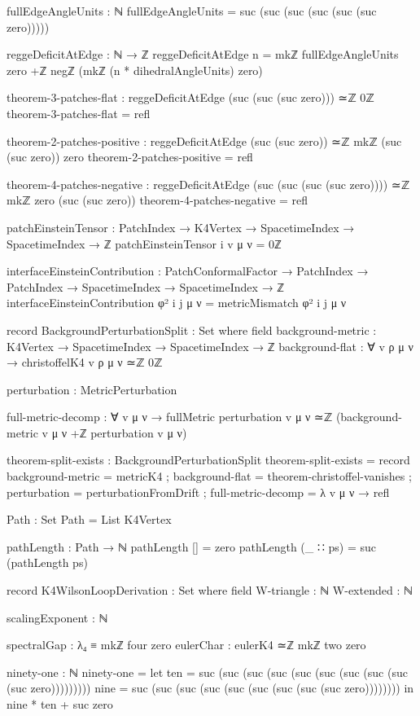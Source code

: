\documentclass[11pt,a4paper]{book}
\begin{document}
\begin{code}
fullEdgeAngleUnits : ℕ
fullEdgeAngleUnits = suc (suc (suc (suc (suc (suc zero)))))


reggeDeficitAtEdge : ℕ → ℤ
reggeDeficitAtEdge n = 
  mkℤ fullEdgeAngleUnits zero +ℤ 
  negℤ (mkℤ (n * dihedralAngleUnits) zero)

theorem-3-patches-flat : reggeDeficitAtEdge (suc (suc (suc zero))) ≃ℤ 0ℤ
theorem-3-patches-flat = refl

theorem-2-patches-positive : reggeDeficitAtEdge (suc (suc zero)) ≃ℤ mkℤ (suc (suc zero)) zero
theorem-2-patches-positive = refl

theorem-4-patches-negative : reggeDeficitAtEdge (suc (suc (suc (suc zero)))) ≃ℤ mkℤ zero (suc (suc zero))
theorem-4-patches-negative = refl

patchEinsteinTensor : PatchIndex → K4Vertex → SpacetimeIndex → SpacetimeIndex → ℤ
patchEinsteinTensor i v μ ν = 0ℤ

interfaceEinsteinContribution : PatchConformalFactor → PatchIndex → PatchIndex → 
                                 SpacetimeIndex → SpacetimeIndex → ℤ
interfaceEinsteinContribution φ² i j μ ν = 
  metricMismatch φ² i j μ ν

record BackgroundPerturbationSplit : Set where
  field
    background-metric  : K4Vertex → SpacetimeIndex → SpacetimeIndex → ℤ
    background-flat    : ∀ v ρ μ ν → christoffelK4 v ρ μ ν ≃ℤ 0ℤ
    
    perturbation       : MetricPerturbation
    
    full-metric-decomp : ∀ v μ ν → 
      fullMetric perturbation v μ ν ≃ℤ (background-metric v μ ν +ℤ perturbation v μ ν)

theorem-split-exists : BackgroundPerturbationSplit
theorem-split-exists = record
  { background-metric  = metricK4
  ; background-flat    = theorem-christoffel-vanishes
  ; perturbation       = perturbationFromDrift
  ; full-metric-decomp = λ v μ ν → refl
  }

Path : Set
Path = List K4Vertex

pathLength : Path → ℕ
pathLength [] = zero
pathLength (_ ∷ ps) = suc (pathLength ps)

record K4WilsonLoopDerivation : Set where
  field
    W-triangle : ℕ
    W-extended : ℕ
    
    scalingExponent : ℕ
    
    spectralGap  : λ₄ ≡ mkℤ four zero
    eulerChar    : eulerK4 ≃ℤ mkℤ two zero

ninety-one : ℕ
ninety-one = 
  let ten = suc (suc (suc (suc (suc (suc (suc (suc (suc (suc zero)))))))))
      nine = suc (suc (suc (suc (suc (suc (suc (suc (suc zero))))))))
  in nine * ten + suc zero


\end{code}
\end{document}
